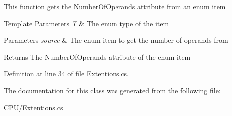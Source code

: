 This function gets the Number\+Of\+Operands attribute from an enum item 


\begin{DoxyTemplParams}{Template Parameters}
{\em T} & The enum type of the item\\
\hline
\end{DoxyTemplParams}

\begin{DoxyParams}{Parameters}
{\em source} & The enum item to get the number of operands from\\
\hline
\end{DoxyParams}
\begin{DoxyReturn}{Returns}
The Number\+Of\+Operands attribute of the enum item 
\end{DoxyReturn}


Definition at line 34 of file Extentions.\+cs.



The documentation for this class was generated from the following file\+:\begin{DoxyCompactItemize}
\item 
C\+P\+U/\hyperlink{_c_p_u_2_extentions_8cs}{Extentions.\+cs}\end{DoxyCompactItemize}
